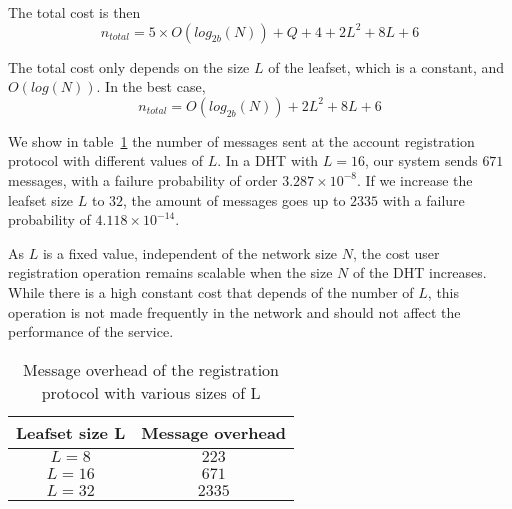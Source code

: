      The total cost is then
    $$
      n_{total} = 5 \times O(log_{2b}(N)) + Q + 4 + 2L^2 + 8L + 6
    $$    

    The total cost only depends on the size $L$ of the leafset, which is a
constant, and $O(log(N))$. In the best case, 
    $$
      n_{total} = O(log_{2b}(N)) + 2L^2 + 8L + 6
    $$

    We show in table~\ref{tab:registration_messages} the number of messages sent at
    the account registration protocol with different values of $L$. In a DHT with
    $L = 16$, our system sends $671$ messages, with a failure probability of
    order $3.287 \times 10^{-8}$. If we increase the leafset size $L$ to $32$, the amount of
    messages goes up to $2335$ with a failure probability of $4.118 \times 10^{-14}$.
  
    As $L$ is a fixed value, independent of the network size $N$, the cost user
    registration operation remains scalable when the
    size $N$ of the DHT increases. While there is a high constant cost that
    depends of the number of $L$, this operation is not made frequently
    in the network and should not affect the performance of the
    service.


\begin{table}
  \centering
  \footnotesize
  \begin{tabular}{|c|c|}
    \hline
     \textbf{Leafset size L} & \textbf{Message overhead}\\
    \hline
      $L = 8$ & $223$\\
    \hline
      $L = 16$ & $671$\\
    \hline
      $L = 32$ & $2335$\\
    \hline
  \end{tabular}
  \caption{Message overhead of the registration protocol with various sizes of L}
  \label{tab:registration_messages}
\end{table}


